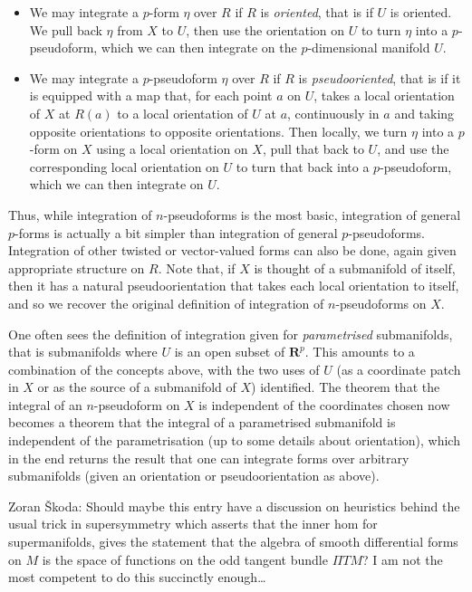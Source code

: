 \documentclass[preprint, 5p, 10pt]{elsarticle}
\theoremstyle{plain}
\begin{document}
\begin{itemize}%
\item We may integrate a $p$-form $\eta$ over $R$ if $R$ is \emph{oriented}, that is if $U$ is oriented. We pull back $\eta$ from $X$ to $U$, then use the orientation on $U$ to turn $\eta$ into a $p$-pseudoform, which we can then integrate on the $p$-dimensional manifold $U$.


\item We may integrate a $p$-pseudoform $\eta$ over $R$ if $R$ is \emph{pseudooriented}, that is if it is equipped with a map that, for each point $a$ on $U$, takes a local orientation of $X$ at $R(a)$ to a local orientation of $U$ at $a$, continuously in $a$ and taking opposite orientations to opposite orientations. Then locally, we turn $\eta$ into a $p$-form on $X$ using a local orientation on $X$, pull that back to $U$, and use the corresponding local orientation on $U$ to turn that back into a $p$-pseudoform, which we can then integrate on $U$.



\end{itemize}
Thus, while integration of $n$-pseudoforms is the most basic, integration of general $p$-forms is actually a bit simpler than integration of general $p$-pseudoforms. Integration of other twisted or vector-valued forms can also be done, again given appropriate structure on $R$. Note that, if $X$ is thought of a submanifold of itself, then it has a natural pseudoorientation that takes each local orientation to itself, and so we recover the original definition of integration of $n$-pseudoforms on $X$.

One often sees the definition of integration given for \emph{parametrised} submanifolds, that is submanifolds where $U$ is an open subset of $\mathbf{R}^p$. This amounts to a combination of the concepts above, with the two uses of $U$ (as a coordinate patch in $X$ or as the source of a submanifold of $X$) identified. The theorem that the integral of an $n$-pseudoform on $X$ is independent of the coordinates chosen now becomes a theorem that the integral of a parametrised submanifold is independent of the parametrisation (up to some details about orientation), which in the end returns the result that one can integrate forms over arbitrary submanifolds (given an orientation or pseudoorientation as above).

Zoran Škoda: Should maybe this entry have a discussion on heuristics behind the usual trick in supersymmetry which asserts that the inner hom for supermanifolds, gives the statement that the algebra of smooth differential forms on $M$ is the space of functions on the odd tangent bundle $\Pi T M$? I am not the most competent to do this succinctly enough\ldots{}
\end{document}
